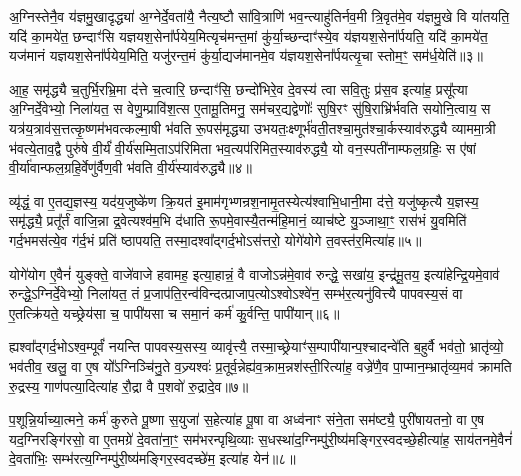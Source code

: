 अ॒ग्निस्तेनै॒व य॑ज्ञमु॒खादृद्ध्या॑ अ॒ग्नेर्दे॒वता॑यै॒ नैत्य॒ष्टौ सा॑वि॒त्राणि॑ भव॒न्त्याहु॑तिर्नव॒मी त्रि॒वृत॑मे॒व य॑ज्ञमु॒खे वि या॑तयति॒ यदि॑ का॒मये॑त॒ छन्दाꣳ॑सि यज्ञयश॒सेना᳚र्पयेय॒मित्यृच॑मन्त॒मां कु॑र्या॒च्छन्दाꣳ॑स्ये॒व य॑ज्ञयश॒सेना᳚र्पयति॒ यदि॑ का॒मये॑त॒ यज॑मानं यज्ञयश॒सेना᳚र्पयेय॒मिति॒ यजु॑रन्त॒मं कु॑र्या॒द्यज॑मानमे॒व य॑ज्ञयश॒सेना᳚र्पयत्यृ॒चा स्तोम॒ꣳ॒ सम॑र्ध॒येति॑॥३॥

आ॒ह॒ समृ॑द्ध्यै च॒तुर्भि॒रभ्रि॒मा द॑त्ते च॒त्वारि॒ छन्दाꣳ॑सि॒ छन्दो॑भिरे॒व दे॒वस्य॑ त्वा सवि॒तुः प्र॑स॒व इत्या॑ह॒ प्रसू᳚त्या अ॒ग्निर्दे॒वेभ्यो॒ निला॑यत॒ स वेणु॒म्प्रावि॑श॒त्स ए॒तामू॒तिमनु॒ सम॑चर॒द्यद्वेणोः᳚ सुषि॒रꣳ सु॑षि॒राभ्रि॑र्भवति सयोनि॒त्वाय॒ स यत्र॑य॒त्राव॑स॒त्तत्कृ॒ष्णम॑भवत्कल्मा॒षी भ॑वति रू॒पस॑मृद्ध्या उभयतः॒क्ष्णूर्भ॑वती॒तश्चा॒मुत॑श्चा॒र्कस्याव॑रुद्ध्यै व्याममा॒त्री भ॑वत्ये॒ताव॒द्वै पुरु॑षे वी॒र्यं॑ वी॒र्य॑सम्मि॒ता\-ऽप॑रिमिता भव॒त्यप॑रिमित॒स्याव॑रुद्ध्यै॒ यो वन॒स्पती॑नाम्फल॒ग्रहिः॒ स ए॑षां वी॒र्या॑वान्फल॒ग्रहि॒र्वेणु॑र्वैण॒वी भ॑वति वी॒र्य॑स्याव॑रुद्ध्यै॥४॥

{\anuvakamend[{का॒मये॑त गाय॒त्रो᳚\-ऽर्ध॒येति॑ च स॒प्तविꣳ॑शतिश्च॥१॥}]}

व्यृ॑द्धं॒ वा ए॒तद्य॒ज्ञस्य॒ यद॑य॒जुष्के॑ण क्रि॒यत॑ इ॒माम॑गृभ्णन्रश॒नामृ॒तस्येत्य॑श्वाभि॒धानी॒मा द॑त्ते॒ यजु॑ष्कृत्यै य॒ज्ञस्य॒ समृ॑द्ध्यै॒ प्रतू᳚र्तं वाजि॒न्ना द्र॒वेत्यश्व॑म॒भि द॑धाति रू॒पमे॒वास्यै॒तन्म॑हि॒मानं॒ व्याच॑ष्टे यु॒ञ्जाथा॒ꣳ॒ रास॑भं यु॒वमिति॑ गर्द॒भमस॑त्ये॒व ग॑र्द॒भं प्रति॑ ष्ठापयति॒ तस्मा॒दश्वा᳚द्गर्द॒भो\-ऽस॑त्तरो॒ योगे॑योगे त॒वस्त॑र॒मित्या॑ह॥५॥

योगे॑योग ए॒वैनं॑ युङ्क्ते॒ वाजे॑वाजे हवामह॒ इत्या॒हान्नं॒ वै वाजो\-ऽन्न॑मे॒वाव॑ रुन्द्धे॒ सखा॑य॒ इन्द्र॑मू॒तय॒ इत्या॑हेन्द्रि॒यमे॒वाव॑ रुन्द्धे॒\-ऽग्निर्दे॒वेभ्यो॒ निला॑यत॒ तं प्र॒जाप॑ति॒रन्व॑विन्दत्प्राजाप॒त्यो\-ऽश्वो\-ऽश्वे॑न॒ सम्भ॑र॒त्यनु॑वित्त्यै पापवस्य॒सं वा ए॒तत्क्रि॑यते॒ यच्छ्रेय॑सा च॒ पापी॑यसा च समा॒नं कर्म॑ कु॒र्वन्ति॒ पापी॑यान्॥६॥

ह्यश्वा᳚द्गर्द॒भो\-ऽश्व॒म्पूर्वं॑ नयन्ति पापवस्य॒सस्य॒ व्यावृ॑त्त्यै॒ तस्मा॒च्छ्रेयाꣳ॑स॒म्पापी॑यान्प॒श्चादन्वे॑ति ब॒हुर्वै भव॑तो॒ भ्रातृ॑व्यो॒ भव॑तीव॒ खलु॒ वा ए॒ष यो᳚\-ऽग्निञ्चि॑नु॒ते व॒ज्र्यश्वः॑ प्र॒तूर्व॒न्नेह्य॑व॒क्राम॒न्नश॑स्ती॒रित्या॑ह॒ वज्रे॑णै॒व पा॒प्मान॒म्भ्रातृ॑व्य॒मव॑ क्रामति रु॒द्रस्य॒ गाण॑पत्या॒दित्या॑ह रौ॒द्रा वै प॒शवो॑ रु॒द्रादे॒व॥७॥

प॒शून्नि॒र्याच्या॒त्मने॒ कर्म॑ कुरुते पू॒ष्णा स॒युजा॑ स॒हेत्या॑ह पू॒षा वा अध्व॑नाꣳ संने॒ता सम॑ष्ट्यै॒ पुरी॑षायतनो॒ वा ए॒ष यद॒ग्निरङ्गि॑रसो॒ वा ए॒तमग्रे॑ दे॒वता॑ना॒ꣳ॒ सम॑भरन्पृथि॒व्याः स॒धस्था॑द॒ग्निम्पु॑री॒ष्य॑मङ्गिर॒स्वदच्छे॒हीत्या॑ह॒ साय॑तनमे॒वैनं॑ दे॒वता॑भिः॒ सम्भ॑रत्य॒ग्निम्पु॑री॒ष्य॑मङ्गिर॒स्वदच्छे॑म॒ इत्या॑ह येन॑॥८॥

